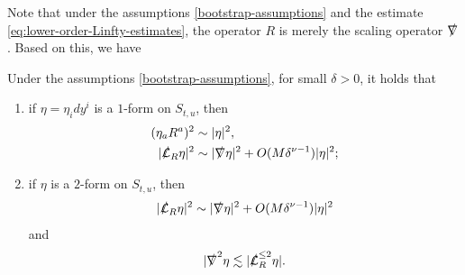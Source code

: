 \documentclass[11pt,twoside]{article}
\begin{document}
Note that under the assumptions \eqref{bootstrap-assumptions} and the estimate \eqref{eq:lower-order-Linfty-estimates},
the operator $R$ is merely the scaling operator $\slashed{\nabla}$. Based on this, we have

\begin{corollary}\label{cor:12form}
Under the assumptions \eqref{bootstrap-assumptions}, for small $\delta>0$, it holds that
 \begin{enumerate}
  \item if $\eta=\eta_idy^i$ is a $1$-form on $S_{t, u}$, then
  \begin{align}
  (\eta_a R^a)^2 &\sim |\eta|^2, \label{eq:1-f}\\
  |\slashed{\mathcal L}_{R}\eta|^2 &\sim |\slashed{\nabla}\eta|^2 + O(M\delta^{\nu-1})|\eta|^2; \label{eq:1f}
  \end{align}

  \item if $\eta$ is a $2$-form on $S_{t, u}$, then
  \begin{equation}\label{eq:2-f}
  |\slashed{\mathcal L}_{R}\eta|^2 \sim |\slashed{\nabla}\eta|^2 + O(M\delta^{\nu-1})|\eta|^2
  \end{equation}
  and
  \begin{equation}\label{eq:2f}
  |\slashed{\nabla}^2\eta \lesssim |\slashed{\mathcal L}_R^{\leq 2}\eta|.
  \end{equation}
 \end{enumerate}
\end{corollary}
\end{document}
